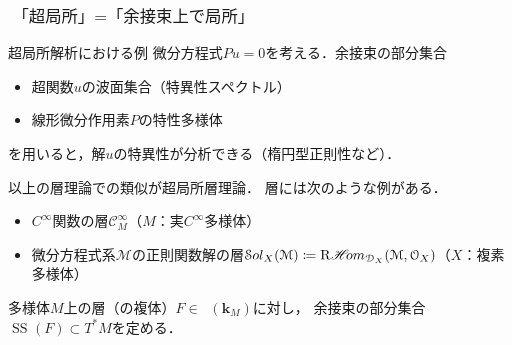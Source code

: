 \documentclass[dvipdfmx,10pt,aspectratio=169,leqno]{beamer}%
\newcommand{\kk}{\mathbf{k}}
\newcommand{\mcal}{\mathcal}
\numberwithin{equation}{subsection}
\newcommand{\cC}{\mcal{C}}
\newcommand{\cD}{\mcal{D}}
\newcommand{\cM}{\mcal{M}}
\newcommand{\cO}{\mcal{O}}
\newcommand{\Dompb}{\mathop{\mathsf{D}^\mathrm{b}}\nolimits}
\newcommand{\HOM}{\mathop{\mathscr{H}\hspace{-2pt}om}\nolimits}%
\newcommand{\RHOM}{\mathop{\mathrm{R}\hspace{-1.5pt}\HOM}\nolimits}
\newcommand{\muS}[1][]{\mathop{\mathrm{SS}}\nolimits_{#1}}
\newcommand{\cotb}[1][]{T^{\ast}{#1}}
\newcommand{\Sol}[2][]{\mathop{\mathcal{S}ol}\nolimits_{#1}(#2)}
\theoremstyle{mystyle}
\begin{document}
\begin{frame}
    \frametitle{\(\text{「超局所」}=\text{「余接束上で局所」}\)}
    \begin{exampleblock}{超局所解析における例}
        微分方程式\(Pu=0\)を考える．余接束の部分集合
        \begin{itemize}
            \item 超関数\(u\)の波面集合（特異性スペクトル）
            \item 線形微分作用素\(P\)の特性多様体
        \end{itemize}
        を用いると，解\(u\)の特異性が分析できる（楕円型正則性など）．
    \end{exampleblock}
    以上の層理論での類似が超局所層理論．
    層には次のような例がある．
    \begin{itemize}
      \item \(C^{\infty}\)関数の層\(\cC^{\infty}_{M}\)（\(M\)：実\(C^{\infty}\)多様体）
      \item 微分方程式系\(\cM\)の正則関数解の層\(\Sol[X]{\cM}\coloneqq\RHOM_{\cD_{X}}(\cM,\cO_{X})\)（\(X\)：複素多様体）
    \end{itemize}
    多様体\(M\)上の層（の複体）\(F\in\Dompb(\kk_{M})\)に対し，
    余接束の部分集合\(\muS[](F)\subset \cotb[M]\)を定める．
\end{frame}
\end{document}
